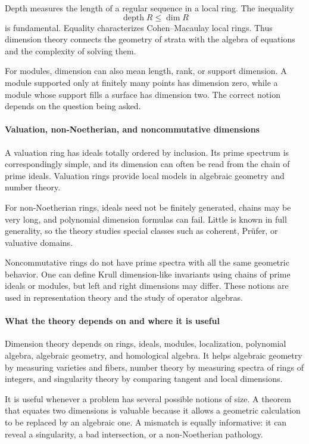 Depth measures the length of a regular sequence in a local ring. The inequality
\[
 \operatorname{depth}R\leq\dim R
\]
is fundamental. Equality characterizes Cohen--Macaulay local rings. Thus dimension theory connects the geometry of strata with the algebra of equations and the complexity of solving them.

For modules, dimension can also mean length, rank, or support dimension. A module supported only at finitely many points has dimension zero, while a module whose support fills a surface has dimension two. The correct notion depends on the question being asked.

\paragraph{Valuation, non-Noetherian, and noncommutative dimensions}

A valuation ring has ideals totally ordered by inclusion. Its prime spectrum is correspondingly simple, and its dimension can often be read from the chain of prime ideals. Valuation rings provide local models in algebraic geometry and number theory.

For non-Noetherian rings, ideals need not be finitely generated, chains may be very long, and polynomial dimension formulas can fail. Little is known in full generality, so the theory studies special classes such as coherent, Prüfer, or valuative domains.

Noncommutative rings do not have prime spectra with all the same geometric behavior. One can define Krull dimension-like invariants using chains of prime ideals or modules, but left and right dimensions may differ. These notions are used in representation theory and the study of operator algebras. \cite{dimension_theory_ref6}

\paragraph{What the theory depends on and where it is useful}

Dimension theory depends on rings, ideals, modules, localization, polynomial algebra, algebraic geometry, and homological algebra. It helps algebraic geometry by measuring varieties and fibers, number theory by measuring spectra of rings of integers, and singularity theory by comparing tangent and local dimensions.

It is useful whenever a problem has several possible notions of size. A theorem that equates two dimensions is valuable because it allows a geometric calculation to be replaced by an algebraic one. A mismatch is equally informative: it can reveal a singularity, a bad intersection, or a non-Noetherian pathology.

